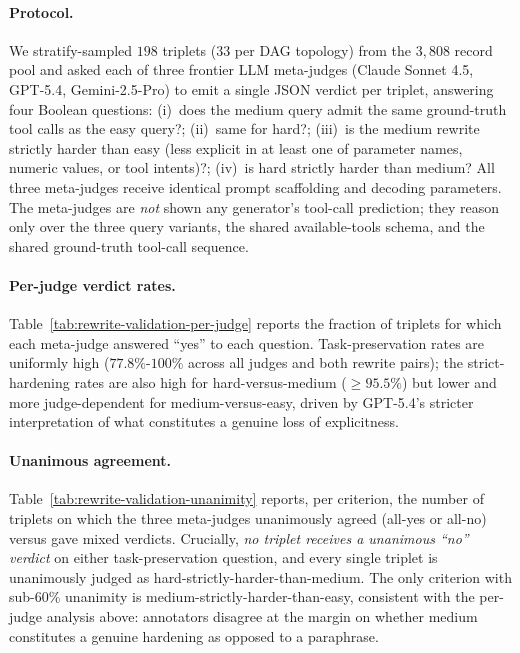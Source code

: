 \paragraph{Protocol.} We stratify-sampled $198$ triplets ($33$ per DAG topology) from the $3{,}808$ record pool and asked each of three frontier LLM meta-judges (Claude Sonnet 4.5, GPT-5.4, Gemini-2.5-Pro) to emit a single JSON verdict per triplet, answering four Boolean questions: (i)~does the medium query admit the same ground-truth tool calls as the easy query?; (ii)~same for hard?; (iii)~is the medium rewrite strictly harder than easy (less explicit in at least one of parameter names, numeric values, or tool intents)?; (iv)~is hard strictly harder than medium? All three meta-judges receive identical prompt scaffolding and decoding parameters. The meta-judges are \emph{not} shown any generator's tool-call prediction; they reason only over the three query variants, the shared available-tools schema, and the shared ground-truth tool-call sequence.

\paragraph{Per-judge verdict rates.}
Table~\ref{tab:rewrite-validation-per-judge} reports the fraction of triplets for which each meta-judge answered ``yes'' to each question. Task-preservation rates are uniformly high ($77.8\%$-$100\%$ across all judges and both rewrite pairs); the strict-hardening rates are also high for hard-versus-medium ($\geq 95.5\%$) but lower and more judge-dependent for medium-versus-easy, driven by GPT-5.4's stricter interpretation of what constitutes a genuine loss of explicitness.



\paragraph{Unanimous agreement.}
Table~\ref{tab:rewrite-validation-unanimity} reports, per criterion, the number of triplets on which the three meta-judges unanimously agreed (all-yes or all-no) versus gave mixed verdicts. Crucially, \emph{no triplet receives a unanimous ``no'' verdict} on either task-preservation question, and every single triplet is unanimously judged as hard-strictly-harder-than-medium. The only criterion with sub-$60\%$ unanimity is medium-strictly-harder-than-easy, consistent with the per-judge analysis above: annotators disagree at the margin on whether medium constitutes a genuine hardening as opposed to a paraphrase.


